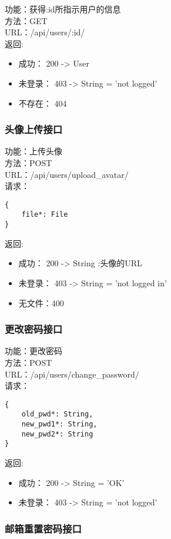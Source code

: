 \noindent
功能：获得:id所指示用户的信息\\
方法：GET\\
URL：/api/users/:id/\\
返回:
\begin{itemize}
	\item 成功： 200 -> User
	\item 未登录： 403 -> String = 'not logged'
	\item 不存在： 404
\end{itemize}



\subsubsection{头像上传接口}

\noindent
功能：上传头像\\
方法：POST\\
URL：/api/users/upload\_avatar/\\
请求：
\begin{lstlisting}[numbers=none, frame=none]
{
    file*: File
}
\end{lstlisting}
返回:
\begin{itemize}
	\item 成功： 200 -> String :头像的URL
	\item 未登录： 403 -> String = 'not logged in'
	\item 无文件：400
\end{itemize}


\subsubsection{更改密码接口}

\noindent
功能：更改密码\\
方法：POST\\
URL：/api/users/change\_password/\\
请求：
\begin{lstlisting}[numbers=none, frame=none]
{
    old_pwd*: String,
    new_pwd1*: String,
    new_pwd2*: String
}
\end{lstlisting}
返回:
\begin{itemize}
	\item 成功： 200 -> String = 'OK'
	\item 未登录： 403 -> String = 'not logged'
\end{itemize}

\subsubsection{邮箱重置密码接口}

